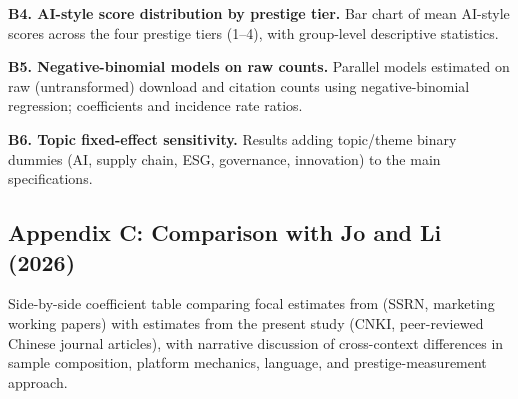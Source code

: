 \documentclass[12pt,a4paper]{article}
\begin{document}
\textbf{B4. AI-style score distribution by prestige tier.}
Bar chart of mean AI-style scores across the four prestige tiers (1--4),
with group-level descriptive statistics.

\textbf{B5. Negative-binomial models on raw counts.}
Parallel models estimated on raw (untransformed) download and citation
counts using negative-binomial regression; coefficients and incidence
rate ratios.

\textbf{B6. Topic fixed-effect sensitivity.}
Results adding topic/theme binary dummies (AI, supply chain, ESG,
governance, innovation) to the main specifications.

\subsection*{Appendix C: Comparison with Jo and Li (2026)}

Side-by-side coefficient table comparing focal estimates from
\citet{JoLi2026} (SSRN, marketing working papers) with estimates from
the present study (CNKI, peer-reviewed Chinese journal articles),
with narrative discussion of cross-context differences in sample
composition, platform mechanics, language, and prestige-measurement
approach.
\end{document}
